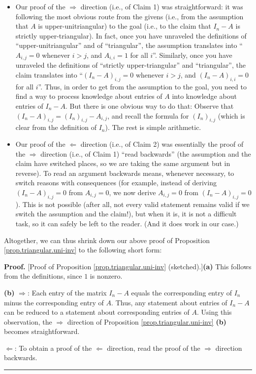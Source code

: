 \documentclass[numbers=enddot,12pt,final,onecolumn,notitlepage]{scrartcl}%
\theoremstyle{definition}
\newenvironment{proof}[1][Proof]{\noindent\textbf{#1.} }{\ \rule{0.5em}{0.5em}}
\begin{document}
\begin{itemize}
\item Our proof of the $\Longrightarrow$ direction (i.e., of Claim 1) was
straightforward: it was following the most obvious route from the givens
(i.e., from the assumption that $A$ is upper-unitriangular) to the goal (i.e.,
to the claim that $I_{n} - A$ is strictly upper-triangular). In fact, once you
have unraveled the definitions of ``upper-unitriangular'' and of
``triangular'', the assumption translates into ``$A_{i,j} = 0$ whenever $i >
j$, and $A_{i,i} = 1$ for all $i$''. Similarly, once you have unraveled the
definitions of ``strictly upper-triangular'' and ``triangular'', the claim
translates into ``$\left(  I_{n}-A\right)  _{i,j} = 0$ whenever $i > j$, and
$\left(  I_{n}-A\right)  _{i,i} = 0$ for all $i$''. Thus, in order to get from
the assumption to the goal, you need to find a way to process knowledge about
entries of $A$ into knowledge about entries of $I_{n} - A$. But there is one
obvious way to do that: Observe that $\left(  I_{n} - A\right)  _{i,j} =
\left(  I_{n}\right)  _{i,j} - A_{i,j}$, and recall the formula for $\left(
I_{n}\right)  _{i,j}$ (which is clear from the definition of $I_{n}$). The
rest is simple arithmetic.

\item Our proof of the $\Longleftarrow$ direction (i.e., of Claim 2) was
essentially the proof of the $\Longrightarrow$ direction (i.e., of Claim 1)
``read backwards'' (the assumption and the claim have switched places, so we
are taking the same argument but in reverse). To read an argument backwards
means, whenever necessary, to switch reasons with consequences (for example,
instead of deriving $\left(  I_{n} - A\right)  _{i, j} = 0$ from $A_{i, j} =
0$, we now derive $A_{i, j} = 0$ from $\left(  I_{n} - A\right)  _{i, j} =
0$). This is not possible (after all, not every valid statement remains valid
if we switch the assumption and the claim!), but when it is, it is not a
difficult task, so it can safely be left to the reader. (And it does work in
our case.)
\end{itemize}

Altogether, we can thus shrink down our above proof of Proposition
\ref{prop.triangular.uni-inv} to the following short form:

\begin{proof}
[Proof of Proposition \ref{prop.triangular.uni-inv} (sketched).]\textbf{(a)}
This follows from the definitions, since $1$ is nonzero.

\textbf{(b)} $\Longrightarrow$: Each entry of the matrix $I_{n} - A$ equals
the corresponding entry of $I_{n}$ minus the corresponding entry of $A$. Thus,
any statement about entries of $I_{n} - A$ can be reduced to a statement about
corresponding entries of $A$. Using this observation, the $\Longrightarrow$
direction of Proposition \ref{prop.triangular.uni-inv} \textbf{(b)} becomes straightforward.

$\Longleftarrow$: To obtain a proof of the $\Longleftarrow$ direction, read
the proof of the $\Longrightarrow$ direction backwards.
\end{proof}
\end{document}
